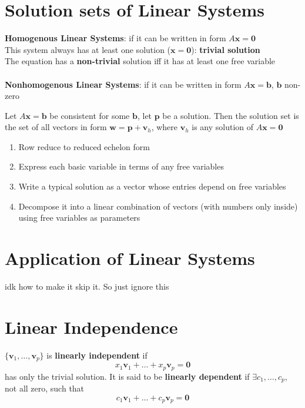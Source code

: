 \documentclass{report}
\begin{document}
\section{Solution sets of Linear Systems}

\textbf{Homogenous Linear Systems}: if it can be written in form $A \mathbf{x} = \mathbf{0}$
\\This system always has at least one solution ($\mathbf{x} = \mathbf{0}$): \textbf{trivial solution}
\\The equation has a \textbf{non-trivial} solution iff it has at least one free variable
\\\\\textbf{Nonhomogenous Linear Systems}: if it can be written in form $A \mathbf{x} = \mathbf{b}$, 
$\mathbf{b}$ non-zero

\begin{theorem}
\end{theorem}
Let $A \mathbf{x} = \mathbf{b}$ be consistent for some $\mathbf{b}$, let $\mathbf{p}$ be a solution.
Then the solution set is the set of all vectors in form $\mathbf{w} = \mathbf{p} + \mathbf{v}_h$, 
where $\mathbf{v}_h$ is any solution of $A \mathbf{x} = \mathbf{0}$

\begin{tcolorbox}[colback=blue!5!white, colframe=blue!75!black, title=Writing a solution set in parametric vector form]
\begin{enumerate}
    \item Row reduce to reduced echelon form
    \item Express each basic variable in terms of any free variables
    \item Write a typical solution as a vector whose entries depend on free variables
    \item Decompose it into a linear combination of vectors (with numbers only inside) using free variables as parameters
\end{enumerate}
\end{tcolorbox}

\section{Application of Linear Systems} idk how to make it skip it. So just ignore this
\section{Linear Independence}
\begin{definition}
\end{definition}
$\{ \mathbf{v}_1, \ldots, \mathbf{v}_p\}$ is \textbf{linearly independent} if 
\[
x_1 \mathbf{v}_1 + \ldots + x_p \mathbf{v}_p = \mathbf{0}
\]
has only the trivial solution. It is said to be \textbf{linearly dependent} if $\exists c_1, \ldots, c_p$, not all zero, such that 
\[
c_1 \mathbf{v}_1 + \ldots + c_p \mathbf{v}_p = \mathbf{0}
\]
\end{document}
